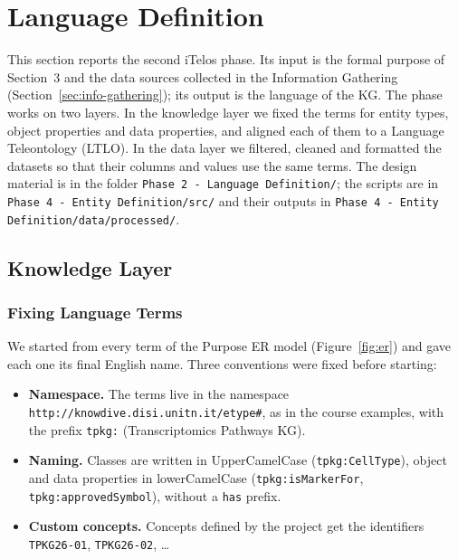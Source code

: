 \section{Language Definition}
\label{sec:language}


This section reports the second iTelos phase. Its input is the formal purpose of Section~3 and the data sources collected in the Information Gathering (Section~\ref{sec:info-gathering}); its output is the language of the KG. The phase works on two layers. In the knowledge layer we fixed the terms for entity types, object properties and data properties, and aligned each of them to a Language Teleontology (LTLO). In the data layer we filtered, cleaned and formatted the datasets so that their columns and values use the same terms. The design material is in the folder \texttt{Phase 2 - Language Definition/}; the scripts are in \texttt{Phase 4 - Entity Definition/src/} and their outputs in \texttt{Phase 4 - Entity Definition/data/processed/}.

\subsection{Knowledge Layer}

\subsubsection{Fixing Language Terms}

We started from every term of the Purpose ER model (Figure~\ref{fig:er}) and gave each one its final English name. Three conventions were fixed before starting:
\begin{itemize}
    \item \textbf{Namespace.} The terms live in the namespace \texttt{http://knowdive.disi.unitn.it/etype\#}, as in the course examples, with the prefix \texttt{tpkg:} (Transcriptomics Pathways KG).
    \item \textbf{Naming.} Classes are written in UpperCamelCase (\texttt{tpkg:CellType}), object and data properties in lowerCamelCase (\texttt{tpkg:isMarkerFor}, \texttt{tpkg:approvedSymbol}), without a \texttt{has} prefix.
    \item \textbf{Custom concepts.} Concepts defined by the project get the identifiers \texttt{TPKG26-01}, \texttt{TPKG26-02}, \ldots
\end{itemize}


